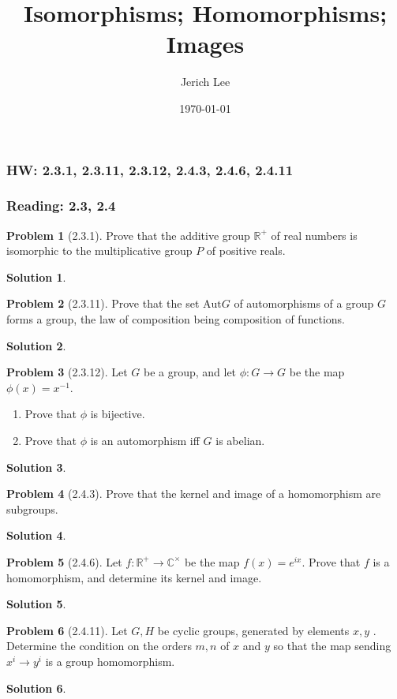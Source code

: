 \documentclass[12pt]{article}
\title{Isomorphisms; Homomorphisms; Images}
\author{Jerich Lee}
\date{\today}
\theoremstyle{definition} %
\newtheorem{solution}{Solution}
\newtheorem{problem}{Problem}
\theoremstyle{plain} %
\begin{document}
\maketitle
\subsubsection*{HW: 2.3.1, 2.3.11, 2.3.12, 2.4.3, 2.4.6, 2.4.11} 
\subsubsection*{Reading: 2.3, 2.4} 
\begin{problem}[2.3.1]
   Prove that the additive group $\mathbb{{R^{+}}}$ of real numbers is isomorphic to the multiplicative group $P$ of positive reals.
\end{problem}
\begin{solution}
    
\end{solution}
\begin{problem}[2.3.11]
   Prove that the set $\text{Aut}  G$ of automorphisms of a group $G$ forms a group, the law of composition being composition of functions. 
\end{problem}
\begin{solution}
    
\end{solution}
\begin{problem}[2.3.12]
   Let $G$ be a group, and let $\phi:G\to G$ be the map $\phi(x)=x^{-1}$.
   \noindent
   \begin{enumerate}
    \item Prove that $\phi$ is bijective.
    \item Prove that $\phi$ is an automorphism iff $G$ is abelian.  
   \end{enumerate}
\end{problem}
\begin{solution}
    
\end{solution}
\begin{problem}[2.4.3]
   Prove that the kernel and image of a homomorphism are subgroups. 
\end{problem}
\begin{solution}
    
\end{solution}
\begin{problem}[2.4.6]
   Let $f:\mathbb{{R}}^{+}\to \mathbb{{C}}^{\times}$ be the map $f(x)=e^{ix}$. Prove that $f$ is a homomorphism, and determine its kernel and image. 
\end{problem}
\begin{solution}
    
\end{solution}
\begin{problem}[2.4.11]
   Let $G,H$ be cyclic groups, generated by elements $x,y$ . Determine the condition on the orders $m,n$ of $x$ and $y$ so that the map sending $x^{i}\to y^{i}$ is a group homomorphism.  
\end{problem}
\begin{solution}
    
\end{solution}
\end{document}
